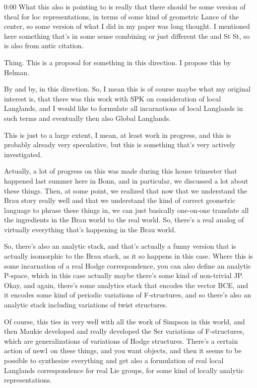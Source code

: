 \begin{unfinished}{0:00}
What this also is pointing to is really that there should be some version of theal for loc representations, in terms of some kind of geometric Lance of the center, so some version of what I did in my paper was long thought. I mentioned here something that's in some sense combining or just different the and St St, so is also from antic citation.

Thing. This is a proposal for something in this direction. I propose this by Helman.

By and by, in this direction. So, I mean this is of course maybe what my original interest is, that there was this work with SPK on consideration of local Langlands, and I would like to formulate all incarnations of local Langlands in such terms and eventually then also Global Langlands.

This is just to a large extent, I mean, at least work in progress, and this is probably already very speculative, but this is something that's very actively investigated.

Actually, a lot of progress on this was made during this house trimester that happened last summer here in Bonn, and in particular, we discussed a lot about these things. Then, at some point, we realized that now that we understand the Brau story really well and that we understand the kind of correct geometric language to phrase these things in, we can just basically one-on-one translate all the ingredients in the Brau world to the real world. So, there's a real analog of virtually everything that's happening in the Brau world.

So, there's also an analytic stack, and that's actually a funny version that is actually isomorphic to the Brau stack, as it so happens in this case. Where this is some incarnation of a real Hodge correspondence, you can also define an analytic P-space, which in this case actually maybe there's some kind of non-trivial JP. Okay, and again, there's some analytics stack that encodes the vector BCE, and it encodes some kind of periodic variations of F-structures, and so there's also an analytic stack including variations of twist structures.

Of course, this ties in very well with all the work of Simpson in this world, and then Maukie developed and really developed the Ser variations of F-structures, which are generalizations of variations of Hodge structures. There's a certain action of new1 on these things, and you want objects, and then it seems to be possible to synthesize everything and get also a formulation of real local Langlands correspondence for real Lie groups, for some kind of locally analytic representations.


\end{unfinished}
